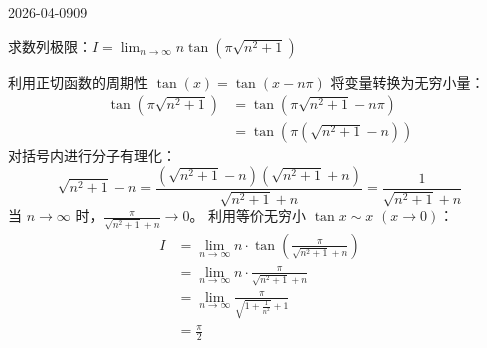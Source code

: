 \begin{mistake}{2026-04-09}{09}

\begin{problemcontent}
求数列极限：\(\displaystyle I = \lim_{n \to \infty} n \tan(\pi \sqrt{n^2+1}) \)
\end{problemcontent}

\begin{solutioncontent}
利用正切函数的周期性 \(\tan(x) = \tan(x - n\pi)\) 将变量转换为无穷小量：
\[
\begin{aligned}
\tan(\pi \sqrt{n^2+1}) 
&= \tan(\pi \sqrt{n^2+1} - n\pi) \\
&= \tan\left( \pi (\sqrt{n^2+1} - n) \right)
\end{aligned}
\]
对括号内进行分子有理化：
\[ \sqrt{n^2+1} - n = \frac{(\sqrt{n^2+1} - n)(\sqrt{n^2+1} + n)}{\sqrt{n^2+1} + n} = \frac{1}{\sqrt{n^2+1} + n} \]
当 \(n \to \infty\) 时，\(\frac{\pi}{\sqrt{n^2+1} + n} \to 0\)。
利用等价无穷小 \(\tan x \sim x\) \((x \to 0)\)：
\[
\begin{aligned}
I &= \lim_{n \to \infty} n \cdot \tan\left( \frac{\pi}{\sqrt{n^2+1} + n} \right) \\
&= \lim_{n \to \infty} n \cdot \frac{\pi}{\sqrt{n^2+1} + n} \\
&= \lim_{n \to \infty} \frac{\pi}{\sqrt{1+\frac{1}{n^2}} + 1} \\
&= \frac{\pi}{2}
\end{aligned}
\]
\end{solutioncontent}


\end{mistake}
